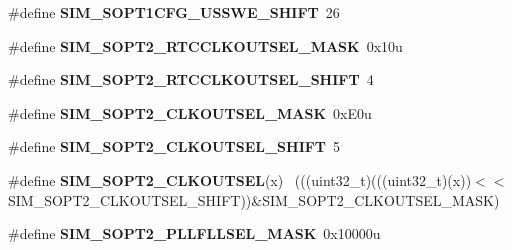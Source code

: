 \begin{DoxyCompactItemize}
\item 
\hypertarget{group___s_i_m___register___masks_ga6984c7260abd4b7caccff970332eb4be}{}\#define {\bfseries S\+I\+M\+\_\+\+S\+O\+P\+T1\+C\+F\+G\+\_\+\+U\+S\+S\+W\+E\+\_\+\+S\+H\+I\+F\+T}~26\label{group___s_i_m___register___masks_ga6984c7260abd4b7caccff970332eb4be}

\item 
\hypertarget{group___s_i_m___register___masks_ga4ecc21f62a92e94e5f507a6bb5e44062}{}\#define {\bfseries S\+I\+M\+\_\+\+S\+O\+P\+T2\+\_\+\+R\+T\+C\+C\+L\+K\+O\+U\+T\+S\+E\+L\+\_\+\+M\+A\+S\+K}~0x10u\label{group___s_i_m___register___masks_ga4ecc21f62a92e94e5f507a6bb5e44062}

\item 
\hypertarget{group___s_i_m___register___masks_gaa4b7f7e8f1999ec0d56a1224cf7eb35d}{}\#define {\bfseries S\+I\+M\+\_\+\+S\+O\+P\+T2\+\_\+\+R\+T\+C\+C\+L\+K\+O\+U\+T\+S\+E\+L\+\_\+\+S\+H\+I\+F\+T}~4\label{group___s_i_m___register___masks_gaa4b7f7e8f1999ec0d56a1224cf7eb35d}

\item 
\hypertarget{group___s_i_m___register___masks_ga601bb7007f58e3ad5433d3538f4dcef0}{}\#define {\bfseries S\+I\+M\+\_\+\+S\+O\+P\+T2\+\_\+\+C\+L\+K\+O\+U\+T\+S\+E\+L\+\_\+\+M\+A\+S\+K}~0x\+E0u\label{group___s_i_m___register___masks_ga601bb7007f58e3ad5433d3538f4dcef0}

\item 
\hypertarget{group___s_i_m___register___masks_ga520c9a255ff79372237f5f332f749112}{}\#define {\bfseries S\+I\+M\+\_\+\+S\+O\+P\+T2\+\_\+\+C\+L\+K\+O\+U\+T\+S\+E\+L\+\_\+\+S\+H\+I\+F\+T}~5\label{group___s_i_m___register___masks_ga520c9a255ff79372237f5f332f749112}

\item 
\hypertarget{group___s_i_m___register___masks_ga7faedd289e00fe163a5dc4f22b9fa3fb}{}\#define {\bfseries S\+I\+M\+\_\+\+S\+O\+P\+T2\+\_\+\+C\+L\+K\+O\+U\+T\+S\+E\+L}(x)                                  ~(((uint32\+\_\+t)(((uint32\+\_\+t)(x))$<$$<$S\+I\+M\+\_\+\+S\+O\+P\+T2\+\_\+\+C\+L\+K\+O\+U\+T\+S\+E\+L\+\_\+\+S\+H\+I\+F\+T))\&S\+I\+M\+\_\+\+S\+O\+P\+T2\+\_\+\+C\+L\+K\+O\+U\+T\+S\+E\+L\+\_\+\+M\+A\+S\+K)\label{group___s_i_m___register___masks_ga7faedd289e00fe163a5dc4f22b9fa3fb}

\item 
\hypertarget{group___s_i_m___register___masks_gaa14141a225f9778babacbf3b90d0bae2}{}\#define {\bfseries S\+I\+M\+\_\+\+S\+O\+P\+T2\+\_\+\+P\+L\+L\+F\+L\+L\+S\+E\+L\+\_\+\+M\+A\+S\+K}~0x10000u\label{group___s_i_m___register___masks_gaa14141a225f9778babacbf3b90d0bae2}


\end{DoxyCompactItemize}
